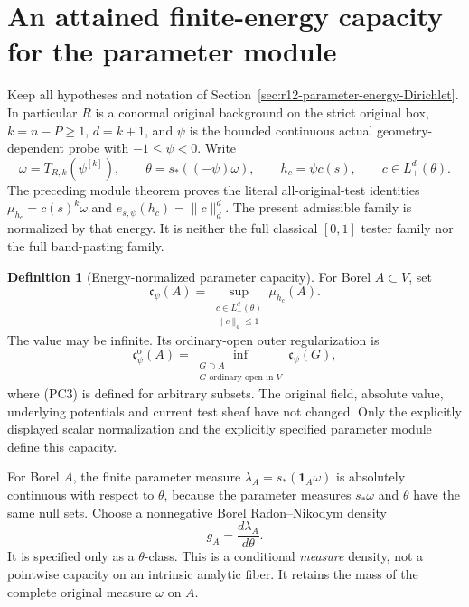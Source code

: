 \documentclass[11pt,a4paper]{article}
\numberwithin{equation}{section}
\theoremstyle{definition}
\newtheorem{definition}[theorem]{Definition}
\theoremstyle{remark}
\begin{document}


\section{An attained finite-energy capacity for the parameter module}
\label{sec:r12-parameter-energy-capacity}

Keep all hypotheses and notation of
Section~\ref{sec:r12-parameter-energy-Dirichlet}. In particular
$R$ is a conormal original background on the strict original box,
$k=n-P\ge1$, $d=k+1$, and $\psi$ is the bounded continuous
actual geometry-dependent probe with $-1\le\psi<0$.
Write
\[
        \omega=T_{R,k}(\psi^{[k]}),\qquad
        \theta=s_*((-\psi)\omega),\qquad
        h_c=\psi c(s),\qquad c\in L^d_+(\theta).
                                                                    \tag{PC1}
\]
The preceding module theorem proves the literal all-original-test
identities
$\mu_{h_c}=c(s)^k\omega$ and
$e_{s,\psi}(h_c)=\|c\|_d^d$. The present admissible family is
normalized by that energy. It is neither the full classical
$[0,1]$ tester family nor the full band-pasting family.

\begin{definition}[Energy-normalized parameter capacity]
\label{def:r12-parameter-energy-capacity}
For Borel $A\subset V$, set
\[
       \mathfrak c_\psi(A)
          =\sup_{\substack{c\in L^d_+(\theta)\\\|c\|_d\le1}}
                                \mu_{h_c}(A).
                                                                    \tag{PC2}
\]
The value may be infinite. Its ordinary-open outer regularization is
\[
       \mathfrak c_\psi^{\mathrm o}(A)
          =\inf_{\substack{G\supset A\\G\text{ ordinary open in }V}}
                                      \mathfrak c_\psi(G),
                                                                    \tag{PC3}
\]
where (PC3) is defined for arbitrary subsets. The original field,
absolute value, underlying potentials and current test sheaf have
not changed. Only the explicitly displayed scalar normalization
and the explicitly specified parameter module define this capacity.
\end{definition}

For Borel $A$, the finite parameter measure
$\lambda_A=s_*(\mathbf1_A\omega)$ is absolutely continuous with
respect to $\theta$, because the parameter measures
$s_*\omega$ and $\theta$ have the same null sets. Choose a
nonnegative Borel Radon--Nikodym density
\[
                            g_A=\frac{d\lambda_A}{d\theta}.
                                                                    \tag{PC4}
\]
It is specified only as a $\theta$-class. This is a conditional
\emph{measure} density, not a pointwise capacity on an intrinsic
analytic fiber. It retains the mass of the complete original
measure $\omega$ on $A$.
\end{document}
